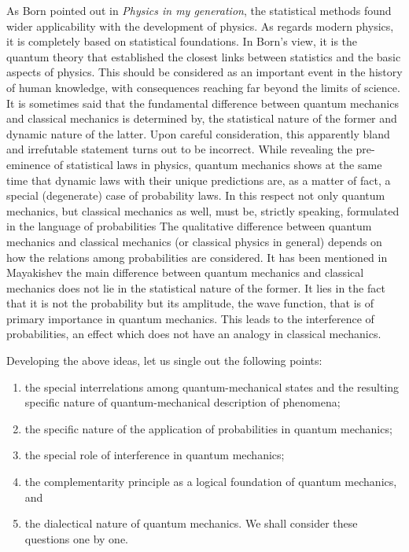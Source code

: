 \documentclass[a4paper,sfsidenotes,colorlinks=true]{tufte-book}
\numberwithin{equation}{section}
\numberwithin{figure}{section}
\begin{document}
As Born pointed out in \emph{Physics in my
  generation},\cite{born-1956} the statistical methods found wider
applicability with the development of physics. As regards modern
physics, it is completely based on statistical foundations. In Born's
view, it is the quantum theory that established the closest links
between statistics and the basic aspects of physics. This should be
considered as an important event in the history of human knowledge,
with consequences reaching far beyond the limits of science. It is
sometimes said that the fundamental difference between quantum
mechanics and classical mechanics is determined by, the statistical
nature of the former and dynamic nature of the latter. Upon careful
consideration, this apparently bland and irrefutable statement turns
out to be incorrect. While revealing the pre-eminence of statistical
laws in physics, quantum mechanics shows at the same time that dynamic
laws with their unique predictions are, as a matter of fact, a special
(degenerate) case of probability laws. In this respect not only
quantum mechanics, but classical mechanics as well, must be, strictly
speaking, formulated in the language of probabilities The qualitative difference between quantum
mechanics and classical mechanics (or classical physics in general)
depends on how the relations among probabilities are considered. It
has been mentioned in Mayakishev the main difference between quantum
mechanics and classical mechanics does not lie in the statistical
nature of the former. It lies in the fact that it is not the
probability but its amplitude, the wave function, that is of primary
importance in quantum mechanics. This leads to the interference of
probabilities, an effect which does not have an analogy in classical
mechanics.


Developing the above ideas, let us single out the following points:
\begin{enumerate}[label=(\alph*),leftmargin=1cm]
\item  the special interrelations among quantum-mechanical states and
the resulting specific nature of quantum-mechanical description of
phenomena;
\item the specific nature of the application of probabilities in quantum mechanics;
\item the special role of interference in quantum mechanics;
\item the complementarity principle as a logical foundation of quantum mechanics, and
\item the dialectical nature of quantum mechanics. We shall consider
  these questions one by one.
\end{enumerate}
\end{document}
